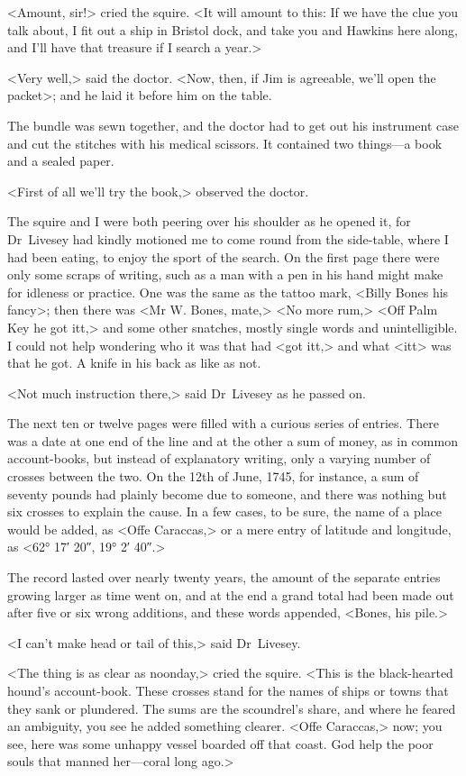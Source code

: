 <Amount, sir!> cried the squire. <It will amount to this: If we have the clue you talk about, I fit out a ship in Bristol dock, and take you and Hawkins here along, and I'll have that treasure if I search a year.>

<Very well,> said the doctor. <Now, then, if Jim is agreeable, we'll open the packet>; and he laid it before him on the table.

The bundle was sewn together, and the doctor had to get out his instrument case and cut the stitches with his medical scissors. It contained two things—a book and a sealed paper.

<First of all we'll try the book,> observed the doctor.

The squire and I were both peering over his shoulder as he opened it, for Dr~Livesey had kindly motioned me to come round from the side-table, where I had been eating, to enjoy the sport of the search. On the first page there were only some scraps of writing, such as a man with a pen in his hand might make for idleness or practice. One was the same as the tattoo mark, <Billy Bones his fancy>; then there was <Mr W\@. Bones, mate,> <No more rum,> <Off Palm Key he got itt,> and some other snatches, mostly single words and unintelligible. I could not help wondering who it was that had <got itt,> and what <itt> was that he got. A knife in his back as like as not.

<Not much instruction there,> said Dr~Livesey as he passed on.

The next ten or twelve pages were filled with a curious series of entries. There was a date at one end of the line and at the other a sum of money, as in common account-books, but instead of explanatory writing, only a varying number of crosses between the two. On the 12th of June, 1745, for instance, a sum of seventy pounds had plainly become due to someone, and there was nothing but six crosses to explain the cause. In a few cases, to be sure, the name of a place would be added, as <Offe Caraccas,> or a mere entry of latitude and longitude, as <62° 17′ 20″, 19° 2′ 40″.>

The record lasted over nearly twenty years, the amount of the separate entries growing larger as time went on, and at the end a grand total had been made out after five or six wrong additions, and these words appended, <Bones, his pile.>

<I can't make head or tail of this,> said Dr~Livesey.

<The thing is as clear as noonday,> cried the squire. <This is the black-hearted hound's account-book. These crosses stand for the names of ships or towns that they sank or plundered. The sums are the scoundrel's share, and where he feared an ambiguity, you see he added something clearer. <Offe Caraccas,> now; you see, here was some unhappy vessel boarded off that coast. God help the poor souls that manned her—coral long ago.>

